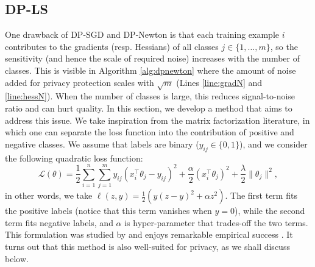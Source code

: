 \documentclass[letterpaper]{article} \usepackage{fullpage}
\def\calL{\mathcal{L}}
\begin{document}
\subsection{DP-LS}
One drawback of DP-SGD and DP-Newton is that each training example $i$ contributes to the gradients (resp. Hessians) of all classes $j \in \{1, \dots, m\}$, so the sensitivity (and hence the scale of required noise) increases with the number of classes. This is visible in Algorithm \ref{alg:dpnewton} where the amount of noise added for privacy protection scales with $\sqrt{m}$ (Lines \ref{line:gradN} and \ref{line:hessN}). When the number of classes is large, this reduces signal-to-noise ratio and can hurt quality. In this section, we develop a method that aims to address this issue. We take inspiration from the matrix factorization literature, in which one can separate the loss function into the contribution of positive and negative classes. We assume that labels are binary ($y_{ij} \in \{0, 1\}$), and we consider the following quadratic loss function:
\[
\calL(\theta) = \frac{1}{2} \sum_{i = 1}^n \sum_{j = 1}^m y_{ij}(x_i^\top \theta_j - y_{ij})^2 + \frac{\alpha}{2}(x_i^\top \theta_j)^2 + \frac{\lambda}{2}\|\theta_j\|^2,
\]
in other words, we take $\ell(z, y) = \frac{1}{2}(y(z-y)^2 + \alpha z^2)$. The first term fits the positive labels (notice that this term vanishes when $y = 0$), while the second term fits negative labels, and $\alpha$ is hyper-parameter that trades-off the two terms. This formulation was studied by \cite{hu2008ials} and enjoys remarkable empirical success \cite{koren2015collaborative}. It turns out that this method is also well-suited for privacy, as we shall discuss below.
\end{document}

